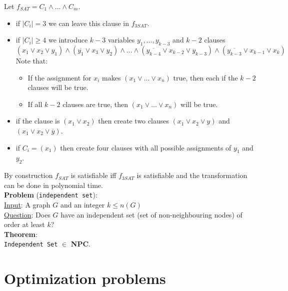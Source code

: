 \documentclass[a4paper, 12pt]{article}
\begin{document}
	Let $f_{SAT} = C_1 \land ... \land C_m$. \begin{itemize}
		\item if $\left|C_i\right| = 3$ we can leave this clause in $f_{3SAT}$.
		\item if $\left|C_i\right| \geq 4$ we introduce $k-3$ variables $y_1,...,y_{k-3}$ and $k-2$ clauses \[(x_1 \lor x_2 \lor y_1) \land (\overline{y_1} \lor x_3 \lor y_2) \land ... \land (\overline{y_{k-4}} \lor x_{k-2} \lor y_{k-3}) \land (\overline{y_{k-3}} \lor x_{k-1} \lor x_k)\]
		Note that: \begin{itemize}
			\item{} If the assignment for $x_i$ makes $(x_1 \lor ... \lor x_n)$ true, then each if the $k-2$ clauses will be true.
			\item If all $k-2$ clauses are true, then $(x_1 \lor ... \lor x_n)$ will be true.
		\end{itemize} 
	\item if the clause is $(x_1\lor x_2)$ then create two clauses $(x_1 \lor x_2 \lor y)$ and $(x_1 \lor x_2 \lor \overline{y})$.
	\item if $C_i = (x_1)$ then create four clauses with all possible assignments of $y_1$ and $y_2$.
	\end{itemize}
	By construction $f_{SAT}$ is satisfiable iff $f_{3SAT}$ is satisfiable and the transformation can be done in polynomial time.\\
	\textbf{Problem} (\texttt{independent set}):\\
	\underline{Input}: A graph $G$ and an integer $k \leq n(G)$\\
	\underline{Question}: Does $G$ have an independent set (set of non-neighbouring nodes) of order at least $k$?\\
	\textbf{Theorem}:\\
	\texttt{Independent Set} $\in$ \textbf{NPC}.
	\section{Optimization problems}
\end{document}
